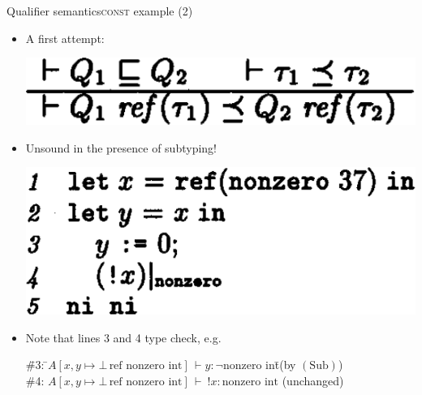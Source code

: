 \documentclass{beamer}
\begin{document}

\begin{frame}{Qualifier semantics}{\textsc{const} example (2)}
  \begin{itemize}
  \item A first attempt:
    \begin{center}
    \includegraphics[scale=0.29]{paper_ref_unsound.png}
    \end{center}
  \item<2-> Unsound in the presence of subtyping!
    \begin{center}
    \includegraphics[scale=0.3]{paper_ref_unsoundsample.png}
    \end{center}
  \item<3->[$\Rightarrow$] Note that lines 3 and 4 type check, e.g.\
    \begin{minipage}[t]{0.3\textwidth}
    \begin{tabbing}
    \=\#3: \=$A[x, y \mapsto \bot\,\text{ref nonzero int}]\,\vdash y : \neg\text{nonzero int}$\quad \=\small(by $(\text{Sub})$)\\
    \>\#4: \>$A[x, y \mapsto \bot\,\text{ref nonzero int}]\,\vdash\ !x : \text{nonzero int}$ \>\small(unchanged)
    \end{tabbing}
    \end{minipage}
  \end{itemize}
\end{frame}
\end{document}
